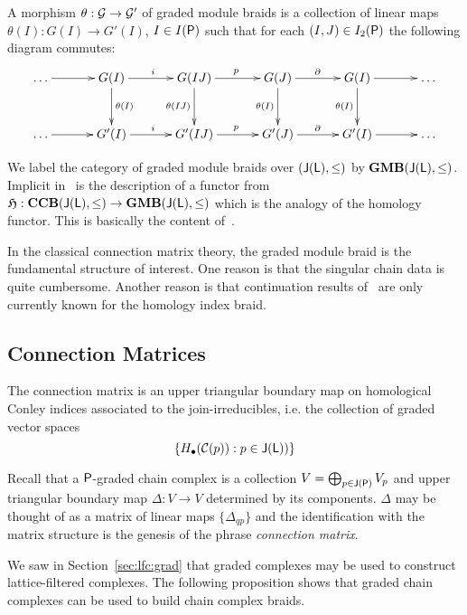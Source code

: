 A morphism $\theta:{\mathcal G}\to {\mathcal G}'$ of graded module braids is a collection of linear maps $\theta(I):G(I)\to G'(I)$, $I\in I({\mathsf P})$ such that for each $(I,J)\in I_2({\mathsf P})$ the following diagram commutes:
\[
\xymatrixrowsep{0.4in}
\xymatrixcolsep{0.45in}
\xymatrix{
\ldots \ar@{->}[r] & G(I) \ar@{->}[d]^{\theta(I)} \ar@{->}[r]^{i} & G(IJ) \ar@{->}[d]_{\theta(IJ)} \ar@{->}[r]^{p} & G(J) \ar@{->}[d]_{\theta(I)} \ar@{->}[r]^{\partial} & G(I) \ar@{->}[d]_{\theta(I)} \ar@{->}[r] & \ldots\\
\ldots \ar@{->}[r] & G'(I) \ar@{->}[r]^{i} & G'(IJ) \ar@{->}[r]^{p} & G'(J) \ar@{->}[r]^{\partial} & G'(I) \ar@{->}[r] &\ldots
}
\]

We label the category of graded module braids over $({\mathsf J}({\mathsf L}),\leq)$ by ${\bf GMB}({\mathsf J}({\mathsf L}),\leq)$.  Implicit in~\cite{fran} is the description of a functor from $\mathfrak{H}:{\bf CCB}({\mathsf J}({\mathsf L}),\leq)\to {\bf GMB}({\mathsf J}({\mathsf L}),\leq)$ which is the analogy of the homology functor.  This is basically the content of~\cite[Proposition 2.7]{fran}.


\begin{rem}
In the classical connection matrix theory, the graded module braid is the fundamental structure of interest.  One reason is that the singular chain data is quite cumbersome.  Another reason is that continuation results of~\cite{fran3}  are only currently known for the homology index braid.
\end{rem}


\subsection{Connection Matrices}

The connection matrix is an upper triangular boundary map on homological Conley indices associated to the join-irreducibles, i.e. the collection of graded vector spaces $$\{H_\bullet({\mathcal C}(p)):p\in {\mathsf J}({\mathsf L}))\}$$


Recall that a ${\mathsf P}$-graded chain complex is a collection $V=\bigoplus_{p\in {\mathsf J}({\mathsf P})} V_p$ and upper triangular boundary map $\Delta:V\to V$ determined by its components.  $\Delta$ may be thought of as a matrix of linear maps $\{\Delta_{qp}\}$ and the identification with the matrix structure is the genesis of the phrase {\em connection matrix}.  

We saw in Section~\ref{sec:lfc:grad} that graded complexes may be used to construct lattice-filtered complexes.  The following proposition shows that graded chain complexes can be used to build chain complex braids.

